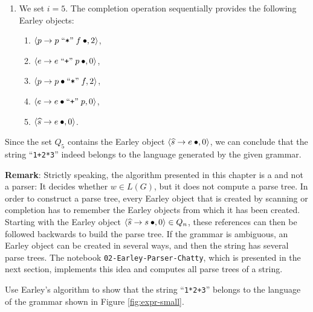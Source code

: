 \begin{enumerate}
\begin{enumerate}
      \item $\pair(f \rightarrow \mdot \squoted{2}, 4)$,
      \item $\pair(f \rightarrow \mdot \squoted{3}, 4)$.
      \end{enumerate}  
      Since the next character is the digit “3”, the scanning operation for $Q_5$ results in:  
      \[
        Q_5 = \{ \pair(f \rightarrow \squoted{3}\mdot, 4) \}.
      \]
\item We set $i = 5$. The completion operation sequentially provides the following Earley objects:
      \begin{enumerate}
      \item $\pair(p \rightarrow p \;\squoted{*}\; f\mdot, 2)$,
      \item $\pair(e \rightarrow e \;\squoted{+}\; p\mdot, 0)$,
      \item $\pair(p \rightarrow p \mdot \squoted{*}\; f, 2)$,
      \item $\pair(e \rightarrow e \mdot \squoted{+}\; p, 0)$,
      \item $\pair(\widehat{s} \rightarrow e\mdot, 0)$.
      \end{enumerate}
\end{enumerate}
Since the set $Q_5$ contains the Earley object $\pair(\widehat{s} \rightarrow e\mdot, 0)$, we can conclude
that the string “\texttt{1+2*3}” indeed belongs to the language generated by the given grammar.

\noindent
\textbf{Remark}: Strictly speaking, the algorithm presented in this chapter is a
 and not a parser:  It decides whether $w \in L(G)$, but it does not compute a
parse tree.  In order to construct a parse tree, every Earley object that is created by scanning or completion has
to remember the Earley objects from which it has been created.  Starting with the Earley object
$\pair(\widehat{s} \rightarrow s \mdot, 0) \in Q_n$, these references can then be followed backwards to build the
parse tree.  If the grammar is ambiguous, an Earley object can be created in several ways, and then the string has
several parse trees.  The notebook \texttt{02-Earley-Parser-Chatty}, which is presented in the next section,
implements this idea and computes all parse trees of a string.
\eox

\exerciseEng
Use Earley's algorithm to show that the string “\texttt{1*2+3}” belongs to the language of the grammar shown in Figure
\ref{fig:expr-small}. \eox


